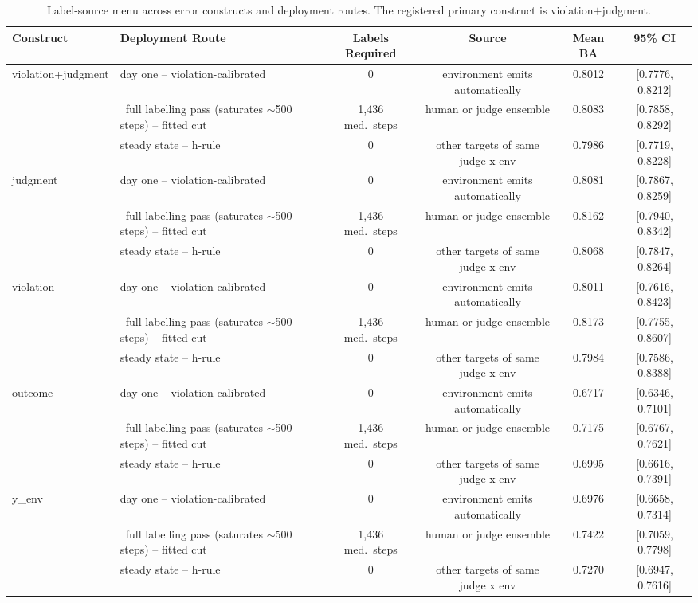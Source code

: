 \begin{table}[t]\centering\small
\caption{Label-source menu across error constructs and deployment routes. The registered primary construct is violation$+$judgment.}
\label{tab:label_source_menu}
\begin{tabular}{llcccc}
\toprule
Construct & Deployment Route & Labels Required & Source & Mean BA & 95\% CI \\
\midrule
violation+judgment & day one -- violation-calibrated & 0 & environment emits automatically & 0.8012 & [0.7776, 0.8212] \\
 & ~full labelling pass (saturates $\sim$500 steps) -- fitted cut & 1{,}436 med.\ steps & human or judge ensemble & 0.8083 & [0.7858, 0.8292] \\
 & steady state -- h-rule & 0 & other targets of same judge x env & 0.7986 & [0.7719, 0.8228] \\
\midrule
judgment & day one -- violation-calibrated & 0 & environment emits automatically & 0.8081 & [0.7867, 0.8259] \\
 & ~full labelling pass (saturates $\sim$500 steps) -- fitted cut & 1{,}436 med.\ steps & human or judge ensemble & 0.8162 & [0.7940, 0.8342] \\
 & steady state -- h-rule & 0 & other targets of same judge x env & 0.8068 & [0.7847, 0.8264] \\
\midrule
violation & day one -- violation-calibrated & 0 & environment emits automatically & 0.8011 & [0.7616, 0.8423] \\
 & ~full labelling pass (saturates $\sim$500 steps) -- fitted cut & 1{,}436 med.\ steps & human or judge ensemble & 0.8173 & [0.7755, 0.8607] \\
 & steady state -- h-rule & 0 & other targets of same judge x env & 0.7984 & [0.7586, 0.8388] \\
\midrule
outcome & day one -- violation-calibrated & 0 & environment emits automatically & 0.6717 & [0.6346, 0.7101] \\
 & ~full labelling pass (saturates $\sim$500 steps) -- fitted cut & 1{,}436 med.\ steps & human or judge ensemble & 0.7175 & [0.6767, 0.7621] \\
 & steady state -- h-rule & 0 & other targets of same judge x env & 0.6995 & [0.6616, 0.7391] \\
\midrule
y\_env & day one -- violation-calibrated & 0 & environment emits automatically & 0.6976 & [0.6658, 0.7314] \\
 & ~full labelling pass (saturates $\sim$500 steps) -- fitted cut & 1{,}436 med.\ steps & human or judge ensemble & 0.7422 & [0.7059, 0.7798] \\
 & steady state -- h-rule & 0 & other targets of same judge x env & 0.7270 & [0.6947, 0.7616] \\
\bottomrule
\end{tabular}
\end{table}
